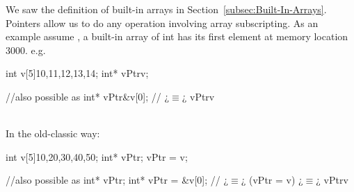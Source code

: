 We saw the definition of built-in arrays in Section~\ref{subsec:Built-In-Arrays}. Pointers allow us to do any operation involving array subscripting. As an example assume , a built-in array of int has its first element at memory location $3000$.  e.g.\\
\begin{minipage}{\MPWxXXSxLISTING\textwidth} %
    \begin{CPPCode}
int v[5]{10,11,12,13,14};
int* vPtr{v};
    \end{CPPCode}
    \end{minipage}
\begin{minipage}{\MPWxSxLISTING\textwidth} %
    \begin{CPPCode}
//also possible as
int* vPtr{&v[0]}; // ¿$\equiv$¿ vPtr{v}
    \end{CPPCode}
    \end{minipage}\\

\noindent In the old-classic way:\\
\begin{minipage}{\MPWxXXSxLISTING\textwidth} %
    \begin{CPPCode}
int v[5]{10,20,30,40,50};
int* vPtr;
vPtr = v;
    \end{CPPCode}
    \end{minipage}
\begin{minipage}{\MPWxSxLISTING\textwidth} %
    \begin{CPPCode}
//also possible as
int* vPtr;
int* vPtr = &v[0]; // ¿$\equiv$¿ (vPtr = v) ¿$\equiv$¿ vPtr{v}
    \end{CPPCode}
    \end{minipage}\\

